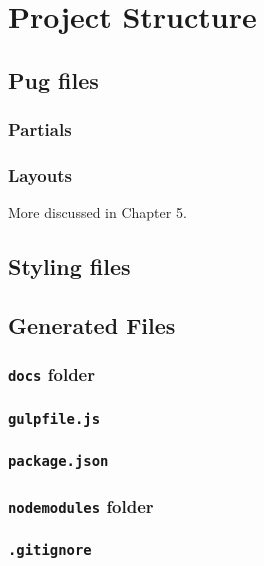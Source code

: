 \chapter{Project Structure}
\label{sec:projstructure}
\section{Pug files}

\subsection{Partials}

\subsection{Layouts}

More discussed in Chapter 5.

\section{Styling files}

\section{Generated Files}

\subsection{\texttt{docs} folder}

\subsection{\texttt{gulpfile.js}}

\subsection{\texttt{package.json}}

\subsection{\texttt{node\textunderscore modules} folder}

\subsection{\texttt{.gitignore}}
\label{sec:gitignore}

